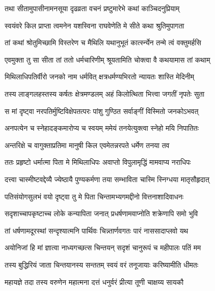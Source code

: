 \twolineshloka
{तथा सीतामुपासीनामनसूया दृढव्रता}
{वचनं प्रष्टुमारेभे कथां काञ्चिदनुप्रियाम्} %

\twolineshloka
{स्वयंवरे किल प्राप्ता त्वमनेन यशस्विना}
{राघवेणेति मे सीते कथा श्रुतिमुपागता} %

\twolineshloka
{तां कथां श्रोतुमिच्छामि विस्तरेण च मैथिलि}
{यथानुभूतं कार्त्स्न्येन तन्मे त्वं वक्तुमर्हसि} %

\twolineshloka
{एवमुक्ता तु सा सीता तां ततो धर्मचारिणीम्}
{श्रूयतामिति चोक्त्वा वै कथयामास तां कथाम्} %

\twolineshloka
{मिथिलाधिपतिर्वीरो जनको नाम धर्मवित्}
{क्षत्रधर्मण्यभिरतो न्यायतः शास्ति मेदिनीम्} %

\twolineshloka
{तस्य लाङ्गलहस्तस्य कर्षतः क्षेत्रमण्डलम्}
{अहं किलोत्थिता भित्त्वा जगतीं नृपतेः सुता} %

\twolineshloka
{स मां दृष्ट्वा नरपतिर्मुष्टिविक्षेपतत्परः}
{पांशु गुण्ठित सर्वाङ्गीं विस्मितो जनकोऽभवत्} %

\twolineshloka
{अनपत्येन च स्नेहादङ्कमारोप्य च स्वयम्}
{ममेयं तनयेत्युक्त्वा स्नेहो मयि निपातितः} %

\twolineshloka
{अन्तरिक्षे च वागुक्ताप्रतिमा मानुषी किल}
{एवमेतन्नरपते धर्मेण तनया तव} %

\twolineshloka
{ततः प्रहृष्टो धर्मात्मा पिता मे मिथिलाधिपः}
{अवाप्तो विपुलामृद्धिं मामवाप्य नराधिपः} %

\twolineshloka
{दत्त्वा चास्मीष्टवद्देव्यै ज्येष्ठायै पुण्यकर्मणा}
{तया सम्भाविता चास्मि स्निग्धया मातृसौहृदात्} %

\twolineshloka
{पतिसंयोगसुलभं वयो दृष्ट्वा तु मे पिता}
{चिन्तामभ्यगमद्दीनो वित्तनाशादिवाधनः} %

\twolineshloka
{सदृशाच्चापकृष्टाच्च लोके कन्यापिता जनात्}
{प्रधर्षणामवाप्नोति शक्रेणापि समो भुवि} %

\twolineshloka
{तां धर्षणामदूरस्थां सन्दृश्यात्मनि पार्थिवः}
{चिन्न्तार्णवगतः पारं नाससादाप्लवो यथ} %

\twolineshloka
{अयोनिजां हि मां ज्ञात्वा नाध्यगच्छत्स चिन्तयन्}
{सदृशं चानुरूपं च महीपालः पतिं मम} %

\twolineshloka
{तस्य बुद्धिरियं जाता चिन्तयानस्य सन्ततम्}
{स्वयं वरं तनूजायाः करिष्यामीति धीमतः} %

\twolineshloka
{महायज्ञे तदा तस्य वरुणेन महात्मना}
{दत्तं धनुर्वरं प्रीत्या तूणी चाक्षय्य सायकौ} %

